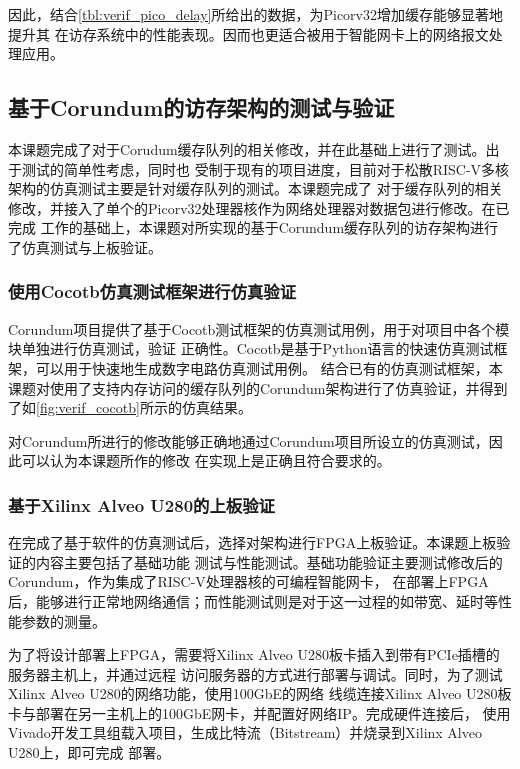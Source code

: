 因此，结合\autoref{tbl:verif_pico_delay}所给出的数据，为Picorv32增加缓存能够显著地提升其
在访存系统中的性能表现。因而也更适合被用于智能网卡上的网络报文处理应用。

\subsection{基于Corundum的访存架构的测试与验证}

本课题完成了对于Corudum缓存队列的相关修改，并在此基础上进行了测试。出于测试的简单性考虑，同时也
受制于现有的项目进度，目前对于松散RISC-V多核架构的仿真测试主要是针对缓存队列的测试。本课题完成了
对于缓存队列的相关修改，并接入了单个的Picorv32处理器核作为网络处理器对数据包进行修改。在已完成
工作的基础上，本课题对所实现的基于Corundum缓存队列的访存架构进行了仿真测试与上板验证。

\subsubsection{使用Cocotb仿真测试框架进行仿真验证}

Corundum项目提供了基于Cocotb测试框架的仿真测试用例，用于对项目中各个模块单独进行仿真测试，验证
正确性。Cocotb是基于Python语言的快速仿真测试框架，可以用于快速地生成数字电路仿真测试用例\cite{cocotb_doc}。
结合已有的仿真测试框架，本课题对使用了支持内存访问的缓存队列的Corundum架构进行了仿真验证，并得到
了如\autoref{fig:verif_cocotb}所示的仿真结果。


对Corundum所进行的修改能够正确地通过Corundum项目所设立的仿真测试，因此可以认为本课题所作的修改
在实现上是正确且符合要求的。

\subsubsection{基于Xilinx Alveo U280的上板验证}

在完成了基于软件的仿真测试后，选择对架构进行FPGA上板验证。本课题上板验证的内容主要包括了基础功能
测试与性能测试。基础功能验证主要测试修改后的Corundum，作为集成了RISC-V处理器核的可编程智能网卡，
在部署上FPGA后，能够进行正常地网络通信；而性能测试则是对于这一过程的如带宽、延时等性能参数的测量。

为了将设计部署上FPGA，需要将Xilinx Alveo U280板卡插入到带有PCIe插槽的服务器主机上，并通过远程
访问服务器的方式进行部署与调试。同时，为了测试Xilinx Alveo U280的网络功能，使用100GbE的网络
线缆连接Xilinx Alveo U280板卡与部署在另一主机上的100GbE网卡，并配置好网络IP。完成硬件连接后，
使用Vivado开发工具组载入项目，生成比特流（Bitstream）并烧录到Xilinx Alveo U280上，即可完成
部署。

